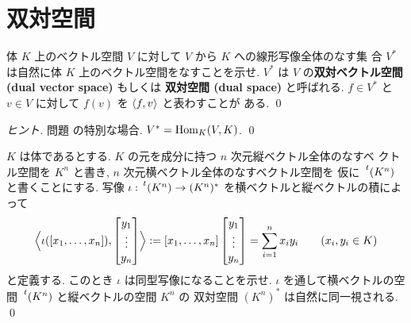 \documentclass[12pt,twoside]{jarticle}
\begin{document}

\section{双対空間}
\label{sec:dual-space}


\begin{question}[双対空間の定義, 5点]
  体 $K$ 上のベクトル空間 $V$ に対して $V$ から $K$ への線形写像全体のなす集
  合 $V^*$ は自然に体 $K$ 上のベクトル空間をなすことを示せ.
  $V^*$ は $V$ の{\bf 双対ベクトル空間 (dual vector space)} もしくは
  {\bf 双対空間 (dual space)} と呼ばれる.
  $f\in V^*$ と $v\in V$ に対して $f(v)$ を $\langle f,v\rangle$ と表わすことが
  ある.
  \qed
\end{question}

\begin{proof}[ヒント]
  問題  の特別な場合. $V^*=\mathop{\mathrm{Hom}}\nolimits_K(V,K)$. \qed
\end{proof}


\begin{question}[横ベクトルの空間と縦ベクトルの空間の双対性, 5点]
  $K$ は体であるとする. $K$ の元を成分に持つ $n$ 次元縦ベクトル全体のなすベ
  クトル空間を $K^n$ と書き, $n$ 次元横ベクトル全体のなすベクトル空間を
  仮に $\tp{(K^n)}$ と書くことにする.
  写像 $\iota:\tp{(K^n)}\to(K^n)^*$ を横ベクトルと縦ベクトルの積によって
  \begin{equation*}
    \Bigl\langle
    \iota([x_1,\ldots,x_n]), 
    \begin{bmatrix}
      y_1 \\ \vdots \\ y_n \\
    \end{bmatrix}
    \Bigr\rangle
    := 
    [x_1,\ldots,x_n]
    \begin{bmatrix}
      y_1 \\ \vdots \\ y_n \\
    \end{bmatrix}
    = \sum_{i=1}^n x_iy_i
    \qquad (x_i,y_i\in K)
  \end{equation*}
  と定義する. このとき $\iota$ は同型写像になることを示せ.
  $\iota$ を通して横ベクトルの空間 $\tp{(K^n)}$ と縦ベクトルの空間 $K^n$ の
  双対空間 $(K^n)^*$ は自然に同一視される.
  \qed
\end{question}
\end{document}
